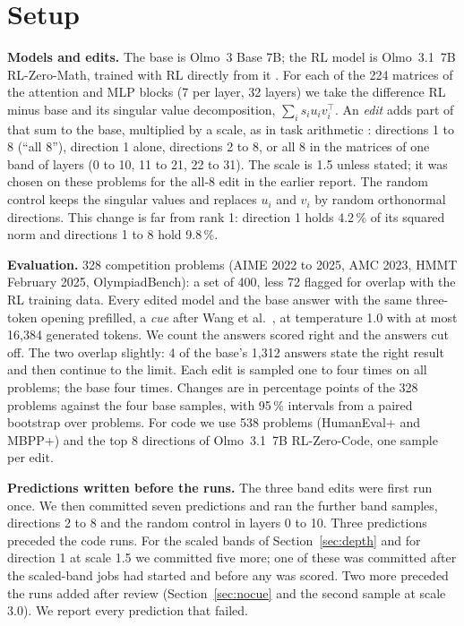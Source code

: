 \documentclass[10pt]{article}
\begin{document}
\section{Setup}

\textbf{Models and edits.} The base is Olmo~3 Base 7B; the RL model is Olmo~3.1~7B RL-Zero-Math, trained with
RL directly from it \cite{olmo2025olmo3}. For each of the 224 matrices of the attention and MLP blocks (7 per
layer, 32 layers) we take the difference RL minus base and its singular value decomposition,
$\sum_i s_i u_i v_i^{\top}$. An \emph{edit} adds part of that sum to the base, multiplied by a scale, as in
task arithmetic \cite{ilharco2022editing}: directions 1 to 8 (``all 8''), direction 1 alone, directions 2 to
8, or all 8 in the matrices of one band of layers (0 to 10, 11 to 21, 22 to 31). The scale is 1.5 unless
stated; it was chosen on these problems for the all-8 edit in the earlier report. The random control keeps
the singular values and replaces $u_i$ and $v_i$ by random orthonormal directions. This change is far from
rank 1: direction 1 holds 4.2\,\% of its squared norm and directions 1 to 8 hold 9.8\,\%.

\textbf{Evaluation.} 328 competition problems (AIME 2022 to 2025, AMC 2023, HMMT February 2025, OlympiadBench):
a set of 400, less 72 flagged for overlap with the RL training data. Every edited model and the base answer
with the same three-token opening prefilled, a \emph{cue} after Wang et al.\ \cite{wang2026base}, at
temperature 1.0 with at most 16{,}384 generated tokens. We count the answers scored right and the answers cut
off. The two overlap slightly: 4 of the base's 1{,}312 answers state the right result and then continue to the
limit. Each edit is sampled one to four times on all problems; the base four times. Changes are in percentage
points of the 328 problems against the four base samples, with 95\,\% intervals from a paired bootstrap over
problems. For code we use 538 problems (HumanEval+ and MBPP+) and the top 8 directions of Olmo~3.1~7B
RL-Zero-Code, one sample per edit.

\textbf{Predictions written before the runs.} The three band edits were first run once. We then committed
seven predictions and ran the further band samples, directions 2 to 8 and the random control in layers 0 to
10. Three predictions preceded the code runs. For the scaled bands of Section~\ref{sec:depth} and for
direction 1 at scale 1.5 we committed five more; one of these was committed after the scaled-band jobs had
started and before any was scored. Two more preceded the runs added after review (Section~\ref{sec:nocue}
and the second sample at scale 3.0). We report every prediction that failed.
\end{document}
